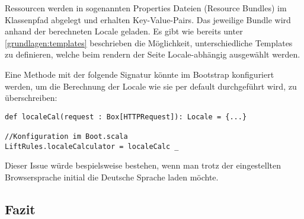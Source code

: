 Ressourcen werden in sogenannten Properties Dateien (Resource Bundles) im Klassenpfad abgelegt und erhalten Key-Value-Pairs. Das jeweilige Bundle wird anhand der berechneten Locale geladen. 
Es gibt wie bereits unter \ref{grundlagen:templates}  beschrieben die M\"oglichkeit, unterschiedliche Templates zu definieren, welche beim rendern der Seite Locale-abh\"angig ausgew\"ahlt werden.

Eine Methode mit der folgende Signatur k\"onnte im Bootstrap konfiguriert werden, um die Berechnung der Locale wie sie per default durchgef\"uhrt wird, zu \"uberschreiben:

\begin{lstlisting}[caption=\"Uberschreibung der Locale-Berechnung]
def localeCal(request : Box[HTTPRequest]): Locale = {...}

//Konfiguration im Boot.scala
LiftRules.localeCalculator = localeCalc _
\end{lstlisting}


Dieser Issue w\"urde bespielsweise bestehen, wenn man trotz der eingestellten Browsersprache initial die Deutsche Sprache laden m\"ochte.

\subsection{Fazit}






